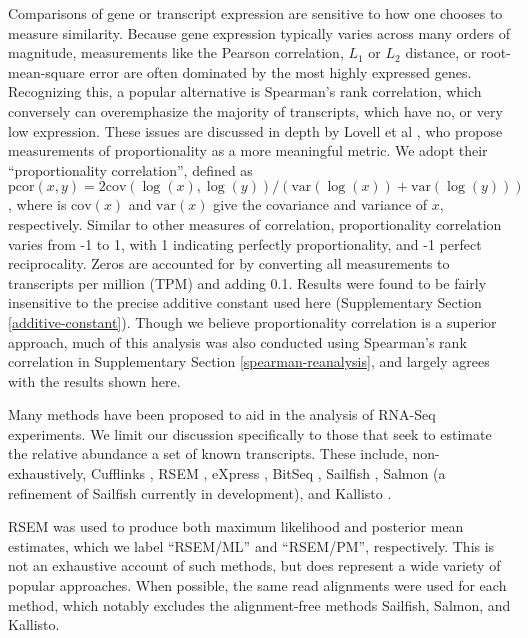 \documentclass[twocolumn]{article}
\begin{document}
Comparisons of gene or transcript expression are sensitive to how one chooses to
measure similarity. Because gene expression typically varies across many orders
of magnitude, measurements like the Pearson correlation, $L_1$ or $L_2$
distance, or root-mean-square error are often dominated by the most highly
expressed genes. Recognizing this, a popular alternative is Spearman's rank
correlation, which conversely can overemphasize the majority of transcripts,
which have no, or very low expression. These issues are discussed in depth by
Lovell et al \cite{Lovell:2015il}, who propose measurements of proportionality
as a more meaningful metric. We adopt their ``proportionality correlation'',
defined as $\text{pcor}(x, y) = 2\text{cov}(\log(x), \log(y)) /
(\text{var}(\log(x)) + \text{var}(\log(y)))$, where is $\text{cov}(x)$ and
$\text{var}(x)$ give the covariance and variance of $x$, respectively. Similar
to other measures of correlation, proportionality correlation varies from -1 to
1, with 1 indicating perfectly proportionality, and -1 perfect reciprocality.
Zeros are accounted for by converting all measurements to transcripts per
million (TPM) and adding 0.1. Results were found to be fairly insensitive to the
precise additive constant used here (Supplementary Section
\ref{additive-constant}). Though we believe proportionality correlation is a
superior approach, much of this analysis was also conducted using Spearman's
rank correlation in Supplementary Section \ref{spearman-reanalysis}, and largely
agrees with the results shown here.

Many methods have been proposed to aid in the analysis of RNA-Seq
experiments. We limit our discussion specifically to those that seek to
estimate the relative abundance a set of known transcripts. These
include, non-exhaustively, Cufflinks \cite{Trapnell:2010kd},
RSEM \cite{Li:2011cb},
eXpress \cite{Roberts:2012dh},
BitSeq \cite{Glaus:2012ek},
Sailfish \cite{Patro:2014jd},
Salmon (a refinement of Sailfish currently in development), and
Kallisto \cite{Bray:2015uj}.

RSEM was used to produce both maximum likelihood and posterior mean estimates,
which we label ``RSEM/ML'' and ``RSEM/PM'', respectively.  This is not an
exhaustive account of such methods, but does represent a wide variety of popular
approaches. When possible, the same read alignments were used for each method,
which notably excludes the alignment-free methods Sailfish, Salmon, and
Kallisto.
\end{document}
